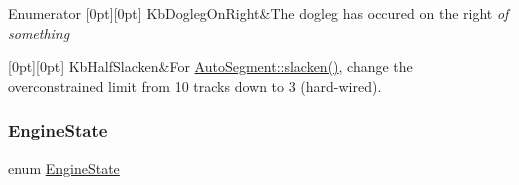 \begin{DoxyEnumFields}{Enumerator}
[0pt][0pt]{}\mbox{\label{namespaceKatabatic_a2af2ad6b6441614038caf59d04b3b217afe7fcb4c332f36e477433169b3d3f515}} 
Kb\+Dogleg\+On\+Right&The dogleg has occured on the right {\itshape of something} \\
\hline

[0pt][0pt]{}\mbox{\label{namespaceKatabatic_a2af2ad6b6441614038caf59d04b3b217a1d6ccf82d04758a0922270d4f469066a}} 
Kb\+Half\+Slacken&For \mbox{\hyperlink{classKatabatic_1_1AutoSegment_a1fbc0adb4c0b14632edc7c55f028cd4b}{Auto\+Segment\+::slacken()}}, change the overconstrained limit from 10 tracks down to 3 (hard-\/wired). \\
\hline

\end{DoxyEnumFields}
\mbox{\label{namespaceKatabatic_ab9e409db5feff0bdbc85e90e2a029cda}} 
\subsubsection{\texorpdfstring{Engine\+State}{EngineState}}
{\footnotesize\ttfamily enum \mbox{\hyperlink{namespaceKatabatic_ab9e409db5feff0bdbc85e90e2a029cda}{Engine\+State}}}

